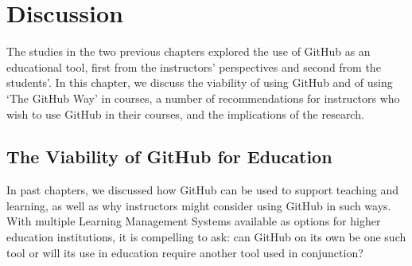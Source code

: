 \chapter{Discussion}
The studies in the two previous chapters explored the use of GitHub as an educational tool, first from the instructors' perspectives and second from the students'. In this chapter, we discuss the viability of using GitHub and of using `The GitHub Way' in courses, a number of recommendations for instructors who wish to use GitHub in their courses, and the implications of the research.

\section{The Viability of GitHub for Education}
In past chapters, we discussed how GitHub can be used to support teaching and learning, as well as why instructors might consider using GitHub in such ways. With multiple Learning Management Systems available as options for higher education institutions, it is compelling to ask: can GitHub on its own be one such tool or will its use in education require another tool used in conjunction?

